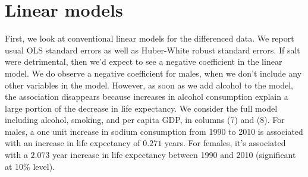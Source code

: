 \documentclass[11pt]{article}\usepackage[]{graphicx}\usepackage[]{color}
\begin{document}
\section{Linear models}


First, we look at conventional linear models for the differenced data. We report usual OLS standard errors as well as Huber-White robust standard errors.
If salt were detrimental, then we'd expect to see a negative coefficient in the linear model.
We do observe a negative coefficient for males, when we don't include any other variables in the model.
However, as soon as we add alcohol to the model, the association disappears because increases in alcohol consumption explain a large portion of the decrease in life expectancy.
We consider the full model including alcohol, smoking, and per capita GDP, in columns (7) and (8).
For males, a one unit increase in sodium consumption from 1990 to 2010 is associated with an increase in life expectancy of $0.271$ years.
For females, it's associated with a $2.073$ year increase in life expectancy between 1990 and 2010 (significant at 10\% level).
\end{document}
